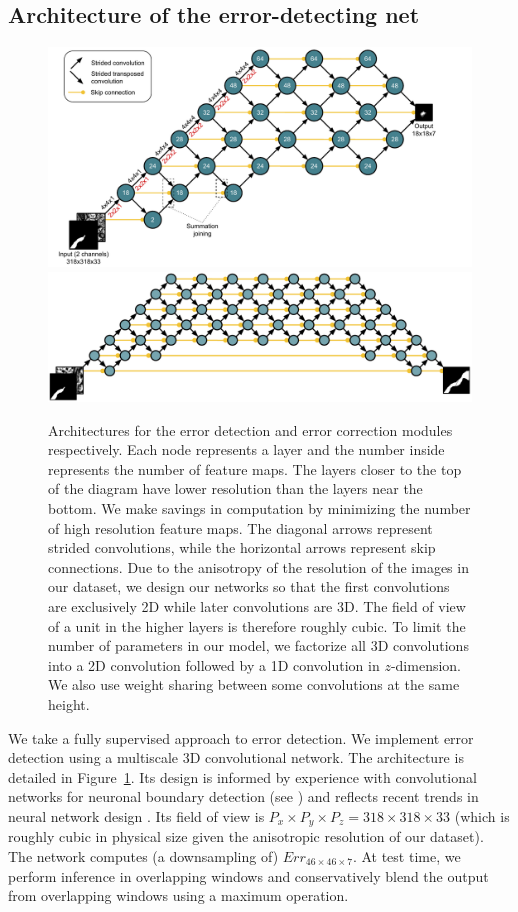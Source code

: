 \documentclass{article}
\begin{document}
\subsection{Architecture of the error-detecting net}
\begin{figure}
\centering
\includegraphics[width=1.0\linewidth]{detector.pdf}
\centering
\includegraphics[width=1.0\linewidth]{corrector2.pdf}

\caption{Architectures for the error detection and error correction modules respectively. Each node represents a layer and the number inside represents the number of feature maps. The layers closer to the top of the diagram have lower resolution than the layers near the bottom. We make savings in computation by minimizing the number of high resolution feature maps. The diagonal arrows represent strided convolutions, while the horizontal arrows represent skip connections. Due to the anisotropy of the resolution of the images in our dataset, we design our networks so that the first convolutions are exclusively 2D while later convolutions are 3D. The field of view of a unit in the higher layers is therefore roughly cubic.
To limit the number of parameters in our model, we factorize all 3D convolutions into a 2D convolution followed by a 1D convolution in $z$-dimension. We also use weight sharing between some convolutions at the same height.}
\label{fig:architecture}
\end{figure}
We take a fully supervised approach to error detection. We implement error detection using a multiscale 3D convolutional network. The architecture is detailed in Figure~\ref{fig:architecture}. Its design is informed by experience with convolutional networks for neuronal boundary detection (see \cite{kisuk}) and reflects recent trends in neural network design \cite{unet,resnet}. Its field of view is $P_x\times P_y\times P_z=318\times 318\times 33$ (which is roughly cubic in physical size given the anisotropic resolution of our dataset). The network computes (a downsampling of) $Err_{46 \times 46 \times 7}$. At test time, we perform inference in overlapping windows and conservatively blend the output from overlapping windows using a maximum operation.
\end{document}
